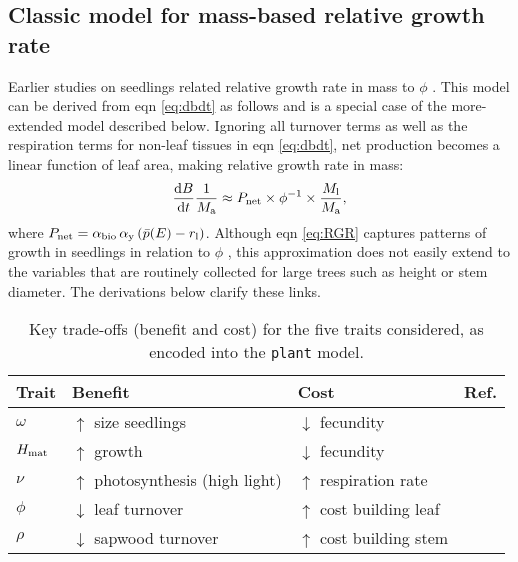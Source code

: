\documentclass[9pt,twocolumn,twoside,lineno]{pnas-new}
\newcommand{\plant}{\texttt{plant}}
\begin{document}
\subsection{Classic model for mass-based relative growth rate}

Earlier studies on seedlings related relative growth rate in mass to $\phi$ \citep{Blackman-1919, Lambers-1992, Cornelissen-1996, Wright-2000}. This model can be derived from eqn \ref{eq:dbdt} as follows and is a special case of the more-extended model described below. Ignoring all turnover terms as well as the respiration terms for non-leaf tissues in eqn \ref{eq:dbdt}, net production becomes a linear function of leaf area, making relative growth rate in mass:
\begin{equation}\label{eq:RGR}
\frac{{\rm d}B}{{\rm d}t}\frac{1}{M_{\rm a}}  \approx P_{\rm net} \times \phi^{-1} \times \frac{M_{\rm l}}{M_{\rm a}}, \end{equation}
where $P_{\rm net} = \alpha_{\rm bio} \, \alpha_{\rm y}\,(\bar{p}(E) - r_{\rm l})$. Although eqn \ref{eq:RGR} captures patterns of growth in seedlings in relation to $\phi$ \citep{Wright-2000}, this approximation does not easily extend to the variables that are routinely collected for large trees such as height or stem diameter. The derivations below clarify these links.

\begin{table}[t]
 \caption{Key trade-offs (benefit and cost) for the five traits considered, as encoded into the {\plant} model.
 }
\centering
  \begin{tabular}{p{0.5cm}p{3.25cm}p{2.25cm}p{1cm}}
  \toprule
  Trait &  Benefit & Cost & Ref. \\
  \midrule
  $\omega$ & $\uparrow$ size seedlings & $\downarrow$ fecundity & \citep{Moles-2006}\\
  $H_{{\rm mat}}$  & $\uparrow$ growth & $\downarrow$ fecundity & \citep{Thomas-2011, Wenk-2015}\\
  $\nu$ & $\uparrow$ photosynthesis (high light) & $\uparrow$ respiration rate & \citep{Wright-2004}\\
  $\phi$ & $\downarrow$ leaf turnover & $\uparrow$ cost building leaf & \citep{Wright-2004}\\
  $\rho$ & $\downarrow$ sapwood turnover & $\uparrow$ cost building stem & \citep{Chave-2009}\\
  \bottomrule
  \end{tabular}
\label{tab:traits}
\end{table}
\end{document}

